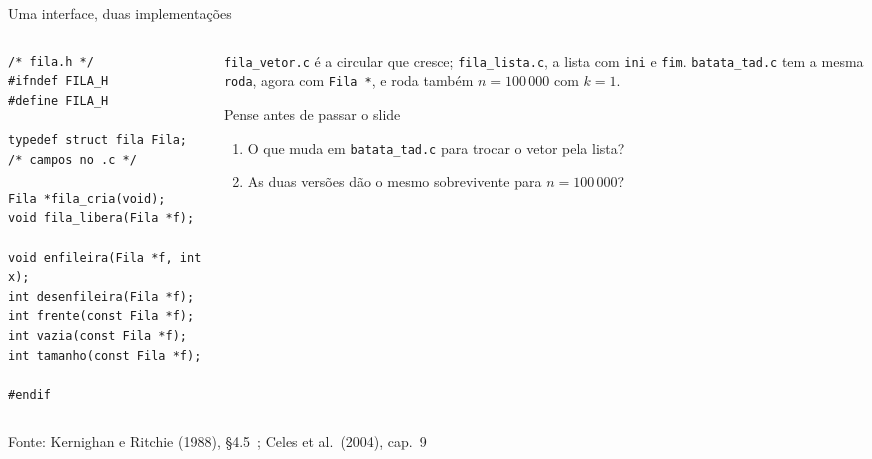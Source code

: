 \documentclass[aspectratio=169]{beamer}
\newcommand{\fonte}[1]{\vfill\hfill{\scriptsize\textcolor{UFSGray}{Fonte: #1}}}
\begin{document}
\begin{frame}[fragile]{Uma interface, duas implementações}
  \begin{columns}[T]
    \begin{column}{0.5\textwidth}
\begin{lstlisting}[style=codC]
/* fila.h */
#ifndef FILA_H
#define FILA_H

typedef struct fila Fila; /* campos no .c */

Fila *fila_cria(void);
void fila_libera(Fila *f);

void enfileira(Fila *f, int x);
int desenfileira(Fila *f);
int frente(const Fila *f);
int vazia(const Fila *f);
int tamanho(const Fila *f);

#endif
\end{lstlisting}
    \end{column}
    \begin{column}{0.46\textwidth}
      \small \texttt{fila\_vetor.c} é a circular que cresce;
      \texttt{fila\_lista.c}, a lista com \texttt{ini} e \texttt{fim}.
      \texttt{batata\_tad.c} tem a mesma \texttt{roda}, agora com
      \texttt{Fila *}, e roda também $n = 100\,000$ com $k = 1$.
      \begin{block}{Pense antes de passar o slide}
        \small
        \begin{enumerate}
          \item O que muda em \texttt{batata\_tad.c} para trocar o vetor
            pela lista?
          \item As duas versões dão o mesmo sobrevivente para
            $n = 100\,000$?
        \end{enumerate}
      \end{block}
    \end{column}
  \end{columns}
  \fonte{Kernighan e Ritchie (1988), §4.5~\cite{kernighan1988c};
    Celes et al.\ (2004), cap.~9~\cite{celes2004introducao}}
\end{frame}
\end{document}
